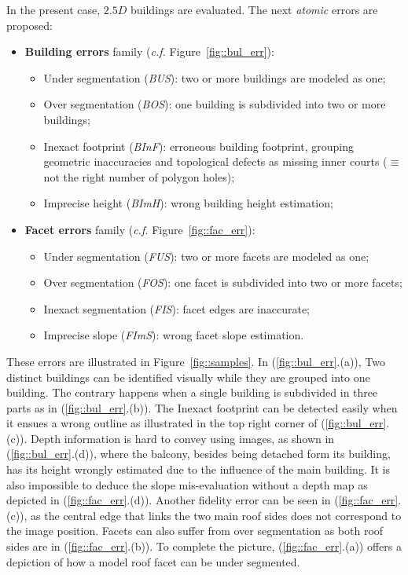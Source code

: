 \documentclass[runningheads]{llncs}
\begin{document}
In the present case, $2.5D$ buildings are evaluated. The next \textit{atomic} errors are proposed:
	\begin{itemize}
		\item \textbf{Building errors} family (\textit{c.f.} Figure~\ref{fig::bul_err}):
        \begin{itemize}
        	\item Under segmentation (\textit{BUS}): two or more buildings are modeled as one;
            \item Over segmentation (\textit{BOS}): one building is subdivided into two or more buildings;
            \item Inexact footprint (\textit{BInF}): erroneous building footprint, grouping geometric inaccuracies and topological defects as missing inner courts ($\equiv$ not the right number of polygon holes);
            \item Imprecise height (\textit{BImH}): wrong building height estimation;
        \end{itemize}
		\item \textbf{Facet errors} family (\textit{c.f.} Figure~\ref{fig::fac_err}):
        \begin{itemize}
        	\item Under segmentation (\textit{FUS}): two or more facets are modeled as one;
            \item Over segmentation (\textit{FOS}): one facet is subdivided into two or more facets;
            \item Inexact segmentation (\textit{FIS}): facet edges are inaccurate;
            \item Imprecise slope (\textit{FImS}): wrong facet slope estimation.
        \end{itemize}
	\end{itemize}

These errors are illustrated in Figure~\ref{fig::samples}. In (\ref{fig::bul_err}.(a)), Two distinct buildings can be identified visually while they are grouped into one building. The contrary happens when a single building is subdivided in three parts as in (\ref{fig::bul_err}.(b)). The Inexact footprint can be detected easily when it ensues a wrong outline as illustrated in the top right corner of (\ref{fig::bul_err}.(c)). Depth information is hard to convey using images, as shown in (\ref{fig::bul_err}.(d)), where the balcony, besides being detached form its building, has its height wrongly estimated due to the influence of the main building. It is also impossible to deduce the slope mis-evaluation without a depth map as depicted in (\ref{fig::fac_err}.(d)). Another fidelity error can be seen in (\ref{fig::fac_err}.(c)), as the central edge that links the two main roof sides does not correspond to the image position. Facets can also suffer from over segmentation as both roof sides are in (\ref{fig::fac_err}.(b)). To complete the picture, (\ref{fig::fac_err}.(a)) offers a depiction of how a model roof facet can be under segmented.
\end{document}

